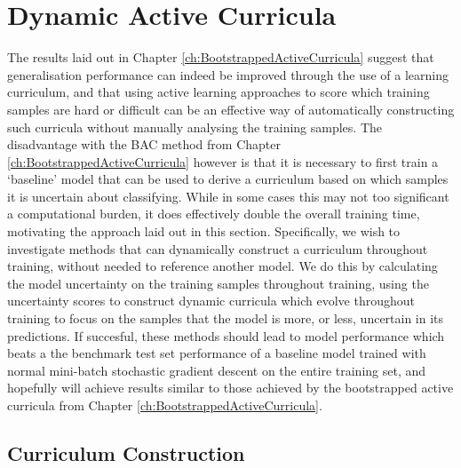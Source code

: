 \chapter{Dynamic Active Curricula}\label{ch:DAC}
The results laid out in Chapter \ref{ch:BootstrappedActiveCurricula} suggest that generalisation performance can indeed be improved through the use of a learning curriculum, and that using active learning approaches to score which training samples are hard or difficult can be an effective way of automatically constructing such curricula without manually analysing the training samples. The disadvantage with the BAC method from Chapter \ref{ch:BootstrappedActiveCurricula} however is that it is necessary to first train a `baseline' model that can be used to derive a curriculum based on which samples it is uncertain about classifying. While in some cases this may not too significant a computational burden, it does effectively double the overall training time, motivating the approach laid out in this section. Specifically, we wish to investigate methods that can dynamically construct a curriculum throughout training, without needed to reference another model. We do this by calculating the model uncertainty on the training samples throughout training, using the uncertainty scores to construct dynamic curricula which evolve throughout training to focus on the samples that the model is more, or less, uncertain in its predictions. If succesful, these methods should lead to model performance which beats a the benchmark test set performance of a baseline model trained with normal mini-batch stochastic gradient descent on the entire training set, and hopefully will achieve results similar to those achieved by the bootstrapped active curricula from Chapter \ref{ch:BootstrappedActiveCurricula}.
\section{Curriculum Construction}
